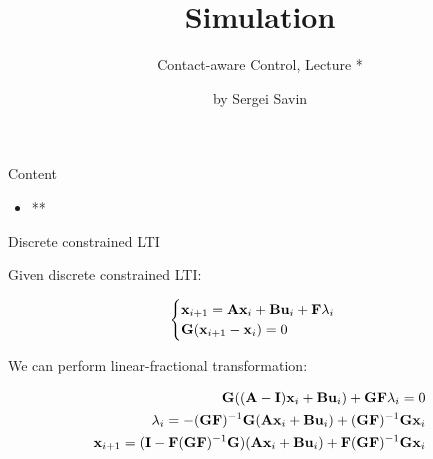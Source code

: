 \documentclass{beamer}
\title{Simulation}
\subtitle{Contact-aware Control, Lecture *}
\author{by Sergei Savin}
\date{\mydate}
\begin{document}
\maketitle


\begin{frame}{Content}

\begin{itemize}
\item **
\end{itemize}

\end{frame}




\begin{frame}{Discrete constrained LTI}
\begin{flushleft}

Given discrete constrained LTI:

\begin{equation}
\begin{cases}
		\mathbf{x}_{i+1} = \mathbf{A}\mathbf{x}_i + \mathbf{B}\mathbf{u}_i + \mathbf{F}\lambda_i
	\\
	\mathbf{G}(\mathbf{x}_{i+1} - \mathbf{x}_i) = 0
\end{cases}
\end{equation}

We can perform linear-fractional transformation:

\begin{align}
		\mathbf{G}((\mathbf{A} - \mathbf{I})\mathbf{x}_i + \mathbf{B}\mathbf{u}_i) + \mathbf{G}\mathbf{F}\lambda_i = 0 
		\\
		\lambda_i = - (\mathbf{G}\mathbf{F})^{-1}\mathbf{G}(\mathbf{A}\mathbf{x}_i + \mathbf{B}\mathbf{u}_i)
		+
		(\mathbf{G}\mathbf{F})^{-1}\mathbf{G}\mathbf{x}_i
		\\
		\mathbf{x}_{i+1} = (\mathbf{I} - \mathbf{F}(\mathbf{G}\mathbf{F})^{-1}\mathbf{G})(\mathbf{A}\mathbf{x}_i + \mathbf{B}\mathbf{u}_i)
		+
		\mathbf{F}(\mathbf{G}\mathbf{F})^{-1}\mathbf{G} \mathbf{x}_i
\end{align}



\end{flushleft}
\end{frame}




\myqrframe
\end{document}
